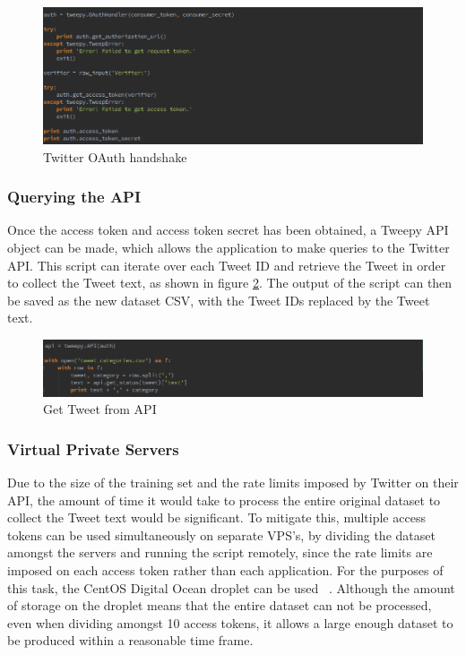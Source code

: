 \begin{figure}[H]
	\centering
	\includegraphics[width=\textwidth]{Images/Implementation/oauth}
	\caption{Twitter OAuth handshake} \label{fig:oauth}
\end{figure}

\subsubsection{Querying the API}
Once the access token and access token secret has been obtained, a Tweepy API object can be made, which allows the application to make queries to the Twitter API. This script can iterate over each Tweet ID and retrieve the Tweet in order to collect the Tweet text, as shown in figure \ref{fig:get-tweets}. The output of the script can then be saved as the new dataset CSV, with the Tweet IDs replaced by the Tweet text.

\begin{figure}[H]
	\centering
	\includegraphics[width=\textwidth]{Images/Implementation/get-tweets}
	\caption{Get Tweet from API} \label{fig:get-tweets}
\end{figure}

\subsubsection{Virtual Private Servers}
Due to the size of the training set and the rate limits imposed by Twitter on their API, the amount of time it would take to process the entire original dataset to collect the Tweet text would be significant. To mitigate this, multiple access tokens can be used simultaneously on separate VPS's, by dividing the dataset amongst the servers and running the script remotely, since the rate limits are imposed on each access token rather than each application. For the purposes of this task, the CentOS Digital Ocean droplet can be used ~\cite{DigitalOcean:Home}. Although the amount of storage on the droplet means that the entire dataset can not be processed, even when dividing amongst 10 access tokens, it allows a large enough dataset to be produced within a reasonable time frame.

